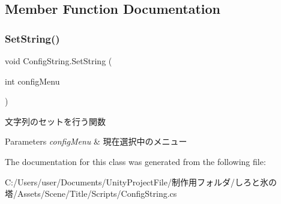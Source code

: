 \subsection{Member Function Documentation}
\mbox{\label{class_config_string_a9457ae28b527dca04d011021e459120c}} 
\subsubsection{\texorpdfstring{Set\+String()}{SetString()}}
{\footnotesize\ttfamily void Config\+String.\+Set\+String (\begin{DoxyParamCaption}\item[{int}]{config\+Menu }\end{DoxyParamCaption})\hspace{0.3cm}{\ttfamily [inline]}}



文字列のセットを行う関数 


\begin{DoxyParams}{Parameters}
{\em config\+Menu} & 現在選択中のメニュー\\
\hline
\end{DoxyParams}


The documentation for this class was generated from the following file\+:\begin{DoxyCompactItemize}
\item 
C\+:/\+Users/user/\+Documents/\+Unity\+Project\+File/制作用フォルダ/しろと氷の塔/\+Assets/\+Scene/\+Title/\+Scripts/Config\+String.\+cs\end{DoxyCompactItemize}
